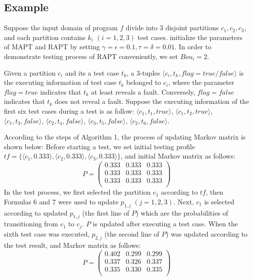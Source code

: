 \documentclass[10pt,journal,compsoc]{IEEEtran}
\begin{document}
\subsection{Example}

Suppose the input domain of program $f$ divide into $3$ disjoint partitions $c_1, c_2, c_3$, and each partition contains $k_i$ $(i=1,2,3)$ test cases. initialize the parameters of MAPT and RAPT by setting $\gamma = \epsilon = 0.1, \tau=\delta=0.01$. In order to demonstrate testing process of RAPT conveniently, we set $Bou_i = 2$.

Given a partition $c_i$ and its a test case $t_k$, a 3-tuples $\langle c_i,t_k,flag = true/false \rangle$ is the executing information of test case $t_k$ belonged to $c_i$, where the parameter $flag = true$ indicates that $t_k$ at least reveals a fault. Conversely, $flag = false$ indicates that $t_k$ does not reveal a fault. Suppose the executing information of the first six test cases during a test is as follow: $\langle c_1,t_1,true \rangle$, $\langle c_1,t_2,true \rangle$, $\langle c_1,t_3,false\rangle$, $\langle c_2,t_4,false \rangle$, $\langle c_3,t_5,false \rangle$, $\langle c_2,t_6,false \rangle$.

 According to the steps of Algorithm 1, the process of updating Markov matrix is shown below: Before starting a test, we set initial testing profile $tf = \{\langle c_1,0.333 \rangle, \langle c_2, 0.333\rangle, \langle c_3, 0.333 \rangle\}$, and initial Markov matrix as follows:
\begin{equation}
\label{eq:Inimatrix}
P =
\begin{pmatrix}
	0.333 & 0.333  & 0.333  \\
	0.333 & 0.333  & 0.333  \\
	0.333 & 0.333  & 0.333  \\
\end{pmatrix}
\end{equation}
In the test process, we first selected the partition $c_1$ according to $tf$, then Formulas 6 and 7 were used to update $p_{1,j}$ $(j = 1,2,3)$. Next, $c_1$ is selected according to updated $p_{1,j}$ (the first line of $P$) which are the probabilities of transitioning from $c_1$ to $c_j$. $P$ is updated after executing a test case. When the sixth test case was executed, $p_{2,j}$ (the second line of $P$) was updated according to the test result, and Markov matrix as follows:
\begin{equation}
\label{eq:sixthmatrix}
P =
\begin{pmatrix}
	0.402 & 0.299  & 0.299  \\
	0.337 & 0.326  & 0.337  \\
	0.335 & 0.330  & 0.335  \\
\end{pmatrix}
\end{equation}
\end{document}
